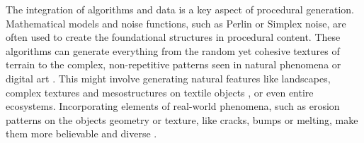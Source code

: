 


The integration of algorithms and data is a key aspect of procedural generation. Mathematical models and noise functions, such as Perlin or Simplex noise, are often used to create the foundational structures in procedural content. These algorithms can generate everything from the random yet cohesive textures of terrain to the complex, non-repetitive patterns seen in natural phenomena or digital art \cite{Vergne2011}. This might involve generating natural features like landscapes, complex textures and mesostructures on textile objects \cite{Michel2023}, or even entire ecosystems. Incorporating elements of real-world phenomena, such as erosion patterns on the objects geometry or texture, like cracks, bumps or melting, make them more believable and diverse \cite{Gobron2001,Wojtan2007,Iwasaki2010}.

